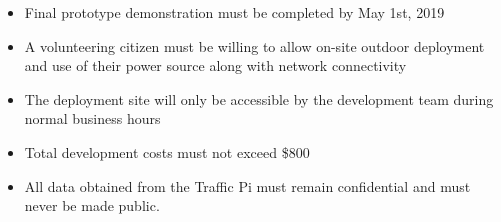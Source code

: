 \begin{itemize}
  \item Final prototype demonstration must be completed by May 1st, 2019
  \item A volunteering citizen must be willing to allow on-site outdoor deployment and use of their power source along with network connectivity 
  \item The deployment site will only be accessible by the development team during normal business hours
  \item Total development costs must not exceed \$800
  \item All data obtained from the Traffic Pi must remain confidential and must never be made public.
\end{itemize}
